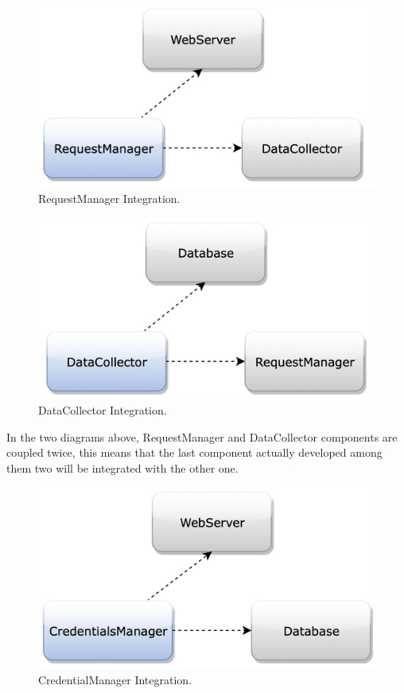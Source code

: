 \begin{figure}[H]
\centering
\includegraphics[scale=0.35]{Images/IntegrationPlanImages/fig1.png}
\caption{RequestManager Integration.}
\end{figure}

\begin{figure}[H]
\centering
\includegraphics[scale=0.35]{Images/IntegrationPlanImages/fig2.png}
\caption{DataCollector Integration.}
\end{figure}

\noindent
In the two diagrams above, RequestManager and DataCollector components are coupled twice, this means that the last component actually developed among them two will be integrated with the other one.

\begin{figure}[H]
\centering
\includegraphics[scale=0.35]{Images/IntegrationPlanImages/fig3.png}
\caption{CredentialManager Integration.}
\end{figure}

